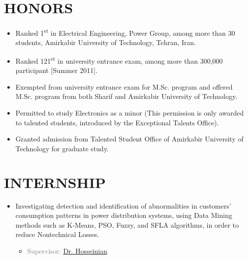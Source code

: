 \section{HONORS}

\begin{itemize}
\item Ranked 1\textsuperscript{st} in Electrical Engineering, Power Group, among more than 30 students,
Amirkabir University of Technology, Tehran, Iran.

\item Ranked 121\textsuperscript{st} in university entrance exam, among more than 300,000
participant [Summer 2011].

\item Exempted from university entrance exam for M.Sc. program and offered M.Sc. program from both
Sharif and Amirkabir University of Technology.

\item Permitted to study Electronics as a minor (This permission is only awarded to talented students, introduced by the Exceptional Talents Office).

\item Granted admission from Talented Student Office of Amirkabir University of Technology for graduate study. \\
\end{itemize}

\vspace{-1 em}
\section{INTERNSHIP}
\begin{itemize}
\item Investigating detection and identification of abnormalities in customers' consumption patterns in power distribution systems, using Data Mining methods such as K-Means, PSO, Fuzzy, and SFLA algorithms, in order to reduce Nontechnical Losses.
\begin{itemize} 
\item\textcolor{gray}{Supervisor: \href{http://www.aut.ac.ir/official/main.asp?uid=hosseinian}{Dr. Hosseinian}} 
\end{itemize}
\end{itemize}

